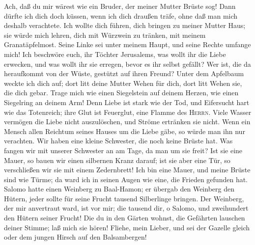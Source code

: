  Ach, daß du mir wärest wie ein Bruder, der meiner Mutter
Brüste sog! Dann dürfte ich dich doch küssen, wenn ich dich draußen
träfe, ohne daß man mich deshalb verachtete.  Ich wollte
dich führen, dich bringen zu meiner Mutter Haus; sie würde mich lehren,
dich mit Würzwein zu tränken, mit meinem Granatäpfelmost. 
Seine Linke sei unter meinem Haupt, und seine Rechte umfange mich!
 Ich beschwöre euch, ihr Töchter Jerusalems, was wollt ihr
die Liebe erwecken, und was wollt ihr sie erregen, bevor es ihr selbst
gefällt?  Wer ist, die da heraufkommt von der Wüste,
gestützt auf ihren Freund? Unter dem Apfelbaum weckte ich dich auf; dort
litt deine Mutter Wehen für dich, dort litt Wehen sie, die dich gebar.
 Trage mich wie einen Siegelstein auf deinem Herzen, wie
einen Siegelring an deinem Arm! Denn Liebe ist stark wie der Tod, und
Eifersucht hart wie das Totenreich; ihre Glut ist Feuerglut, eine Flamme
des \textsc{Herrn}.  Viele Wasser vermögen die Liebe nicht
auszulöschen, und Ströme ertränken sie nicht. Wenn ein Mensch allen
Reichtum seines Hauses um die Liebe gäbe, so würde man ihn nur
verachten.  Wir haben eine kleine Schwester, die noch
keine Brüste hat. Was fangen wir mit unserer Schwester an am Tage, da
man um sie freit?  Ist sie eine Mauer, so bauen wir einen
silbernen Kranz darauf; ist sie aber eine Tür, so verschließen wir sie
mit einem Zedernbrett!  Ich bin eine Mauer, und meine
Brüste sind wie Türme; da ward ich in seinen Augen wie eine, die Frieden
gefunden hat.  Salomo hatte einen Weinberg zu Baal-Hamon;
er übergab den Weinberg den Hütern, jeder sollte für seine Frucht
tausend Silberlinge bringen.  Der Weinberg, der mir
anvertraut ward, ist vor mir; die tausend dir, o Salomo, und zweihundert
den Hütern seiner Frucht!  Die du in den Gärten wohnst,
die Gefährten lauschen deiner Stimme; laß mich sie hören!
 Fliehe, mein Lieber, und sei der Gazelle gleich oder dem
jungen Hirsch auf den Balsambergen!
